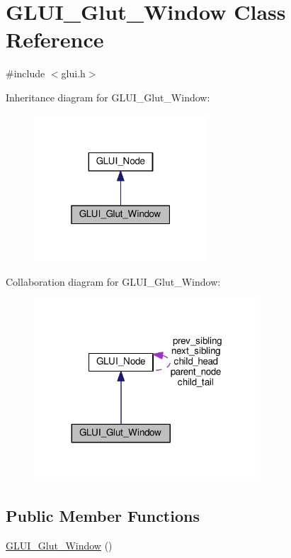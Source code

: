 \hypertarget{class_g_l_u_i___glut___window}{\section{G\+L\+U\+I\+\_\+\+Glut\+\_\+\+Window Class Reference}
\label{class_g_l_u_i___glut___window}
}


{\ttfamily \#include $<$glui.\+h$>$}



Inheritance diagram for G\+L\+U\+I\+\_\+\+Glut\+\_\+\+Window\+:\nopagebreak
\begin{figure}[H]
\begin{center}
\leavevmode
\includegraphics[width=184pt]{class_g_l_u_i___glut___window__inherit__graph}
\end{center}
\end{figure}


Collaboration diagram for G\+L\+U\+I\+\_\+\+Glut\+\_\+\+Window\+:\nopagebreak
\begin{figure}[H]
\begin{center}
\leavevmode
\includegraphics[width=239pt]{class_g_l_u_i___glut___window__coll__graph}
\end{center}
\end{figure}
\subsection*{Public Member Functions}
\begin{DoxyCompactItemize}
\item 
\hyperlink{class_g_l_u_i___glut___window_a5ed74df8dd7b4ed446b1d0cbd8154507}{G\+L\+U\+I\+\_\+\+Glut\+\_\+\+Window} ()
\end{DoxyCompactItemize}

